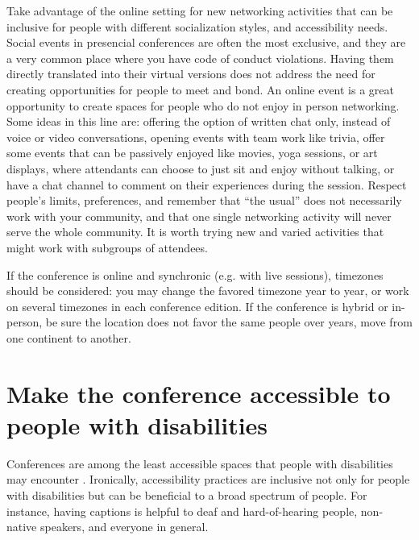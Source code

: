 \documentclass[10pt,letterpaper]{article}
\begin{document}
Take advantage of the online setting for new networking activities that can be inclusive for people with different socialization styles, and accessibility needs. Social events in presencial conferences are often the most exclusive, and they are a very common place where you have code of conduct violations. Having them directly translated into their virtual versions does not address the need for creating opportunities for people to meet and bond. An online event is a great opportunity to create spaces for people who do not enjoy in person networking. Some ideas in this line are: offering the option of written chat only, instead of voice or video conversations, opening events with team work like trivia, offer some events that can be passively enjoyed like movies, yoga sessions, or art displays, where attendants can choose to just sit and enjoy without talking, or have a chat channel to comment on their experiences during the session. Respect people’s limits, preferences, and remember that “the usual” does not necessarily work with your community, and that one single networking activity will never serve the whole community. It is worth trying new and varied activities that might work with subgroups of attendees.

If the conference is online and synchronic (e.g. with live sessions), timezones should be considered: you may change the favored timezone year to year, or work on several timezones in each conference edition. If the conference is hybrid or in-person, be sure the location does not favor the same people over years, move from one continent to another.


\section{Make the conference accessible to people with disabilities}
\label{rule_accessibility}

Conferences are among the least accessible spaces that people with disabilities may encounter \cite{priceAccessImaginedConstruction2009}.
Ironically, accessibility practices are inclusive not only for people with disabilities but can be beneficial to a broad spectrum of people. For instance, having captions is helpful to deaf and hard-of-hearing people, non-native speakers, and everyone in general. 
\end{document}
